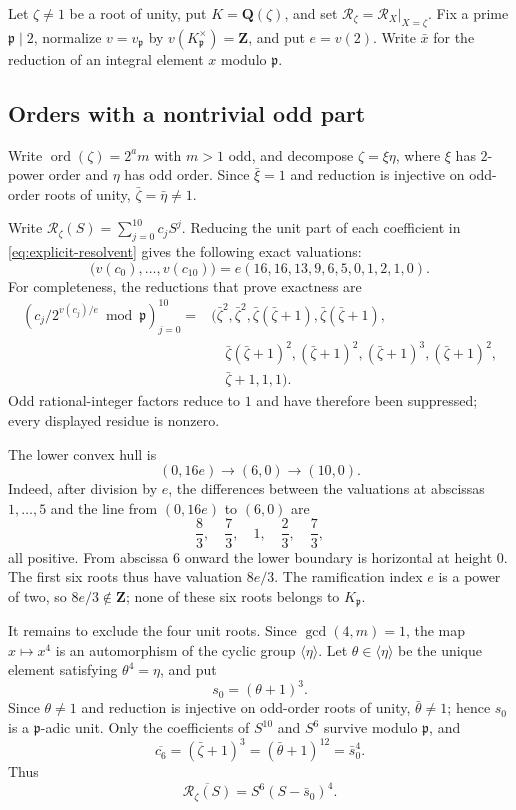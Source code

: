 Let $\zeta\ne1$ be a root of unity, put $K=\mathbf Q(\zeta)$, and set
$\mathcal R_\zeta=\mathcal R_X|_{X=\zeta}$.  Fix a prime
$\mathfrak p\mid2$, normalize $v=v_{\mathfrak p}$ by
$v(K_{\mathfrak p}^\times)=\mathbf Z$, and put $e=v(2)$.
Write $\bar x$ for the reduction of an integral element $x$ modulo
$\mathfrak p$.

\subsection{Orders with a nontrivial odd part}

Write $\operatorname{ord}(\zeta)=2^am$ with $m>1$ odd, and decompose
$\zeta=\xi\eta$, where $\xi$ has $2$-power order and $\eta$ has odd
order.  Since $\bar\xi=1$ and reduction is injective on odd-order roots
of unity, $\bar\zeta=\bar\eta\ne1$.

Write $\mathcal R_\zeta(S)=\sum_{j=0}^{10}c_jS^j$.  Reducing the unit
part of each coefficient in \eqref{eq:explicit-resolvent} gives the
following exact valuations:
\[
 \bigl(v(c_0),\ldots,v(c_{10})\bigr)
 =e(16,16,13,9,6,5,0,1,2,1,0).
\]
For completeness, the reductions that prove exactness are
\begin{align*}
\left(c_j/2^{v(c_j)/e}\bmod\mathfrak p\right)_{j=0}^{10}
={}&\bigl(\bar\zeta^2,\bar\zeta^2,
 \bar\zeta(\bar\zeta+1),\bar\zeta(\bar\zeta+1),\\
&\quad \bar\zeta(\bar\zeta+1)^2,(\bar\zeta+1)^2,
 (\bar\zeta+1)^3,(\bar\zeta+1)^2,\\
&\quad \bar\zeta+1,1,1\bigr).
\end{align*}
Odd rational-integer factors reduce to $1$ and have therefore been
suppressed; every displayed residue is nonzero.

The lower convex hull is
\begin{equation}\label{eq:odd-res-np}
 (0,16e)\longrightarrow(6,0)\longrightarrow(10,0).
\end{equation}
Indeed, after division by $e$, the differences between the valuations at
abscissas $1,\ldots,5$ and the line from $(0,16e)$ to $(6,0)$ are
\[
 \frac83,\quad\frac73,\quad1,\quad\frac23,\quad\frac73,
\]
all positive.  From abscissa $6$ onward the lower boundary is horizontal
at height $0$.  The first six roots thus have
valuation $8e/3$.  The ramification index $e$ is a power of two, so
$8e/3\notin\mathbf Z$; none of these six roots belongs to $K_{\mathfrak p}$.

It remains to exclude the four unit roots.  Since $\gcd(4,m)=1$, the map
$x\mapsto x^4$ is an automorphism of the cyclic group $\langle\eta\rangle$.
Let $\theta\in\langle\eta\rangle$ be the unique element satisfying
$\theta^4=\eta$, and put
\[
 s_0=(\theta+1)^3.
\]
Since $\theta\ne1$ and reduction is injective on odd-order roots of unity,
$\bar\theta\ne1$; hence $s_0$ is a $\mathfrak p$-adic unit.  Only the coefficients
of $S^{10}$ and $S^6$ survive modulo $\mathfrak p$, and
\[
 \overline{c_6}=(\bar\zeta+1)^3
 = (\bar\theta+1)^{12}=\bar s_0^4.
\]
Thus
\begin{equation}\label{eq:odd-res-reduction}
 \overline{\mathcal R_\zeta(S)}
 =S^6(S-\bar s_0)^4.
\end{equation}

